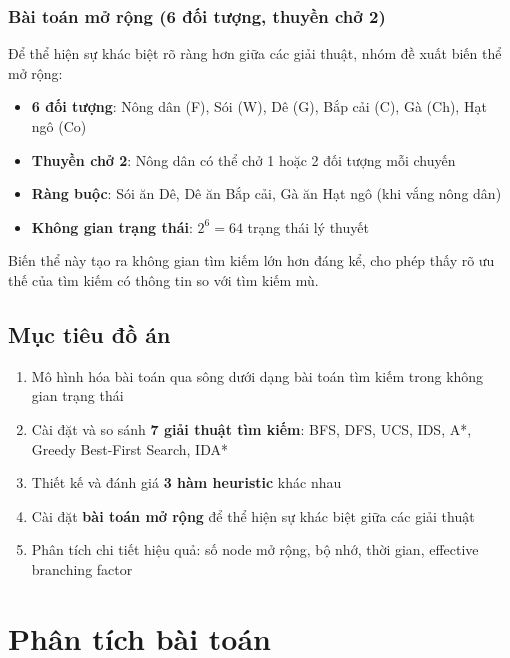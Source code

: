 \documentclass[a4paper,12pt]{article}
\begin{document}
\subsubsection{Bài toán mở rộng (6 đối tượng, thuyền chở 2)}

Để thể hiện sự khác biệt rõ ràng hơn giữa các giải thuật, nhóm đề xuất biến thể mở rộng:

\begin{itemize}
    \item \textbf{6 đối tượng}: Nông dân (F), Sói (W), Dê (G), Bắp cải (C), Gà (Ch), Hạt ngô (Co)
    \item \textbf{Thuyền chở 2}: Nông dân có thể chở 1 hoặc 2 đối tượng mỗi chuyến
    \item \textbf{Ràng buộc}: Sói ăn Dê, Dê ăn Bắp cải, Gà ăn Hạt ngô (khi vắng nông dân)
    \item \textbf{Không gian trạng thái}: $2^6 = 64$ trạng thái lý thuyết
\end{itemize}

Biến thể này tạo ra không gian tìm kiếm lớn hơn đáng kể, cho phép thấy rõ ưu thế của tìm kiếm có thông tin so với tìm kiếm mù.

\subsection{Mục tiêu đồ án}

\begin{enumerate}
    \item Mô hình hóa bài toán qua sông dưới dạng bài toán tìm kiếm trong không gian trạng thái
    \item Cài đặt và so sánh \textbf{7 giải thuật tìm kiếm}: BFS, DFS, UCS, IDS, A*, Greedy Best-First Search, IDA*
    \item Thiết kế và đánh giá \textbf{3 hàm heuristic} khác nhau
    \item Cài đặt \textbf{bài toán mở rộng} để thể hiện sự khác biệt giữa các giải thuật
    \item Phân tích chi tiết hiệu quả: số node mở rộng, bộ nhớ, thời gian, effective branching factor
\end{enumerate}

\section{Phân tích bài toán}
\end{document}
